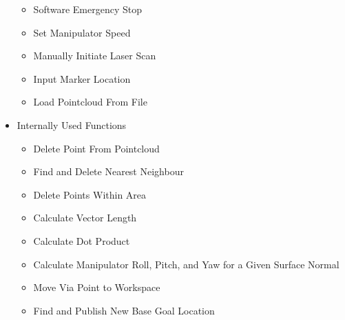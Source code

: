 \begin{itemize}
\begin{itemize}
\item Software Emergency Stop
\item Set Manipulator Speed
\item Manually Initiate Laser Scan
\item Input Marker Location
\item Load Pointcloud From File
\end{itemize}
\item Internally Used Functions
\begin{itemize}
\item Delete Point From Pointcloud
\item Find and Delete Nearest Neighbour
\item Delete Points Within Area
\item Calculate Vector Length
\item Calculate Dot Product
\item Calculate Manipulator Roll, Pitch, and Yaw for a Given Surface Normal
\item Move Via Point to Workspace
\item Find and Publish New Base Goal Location
\end{itemize}
\end{itemize}
